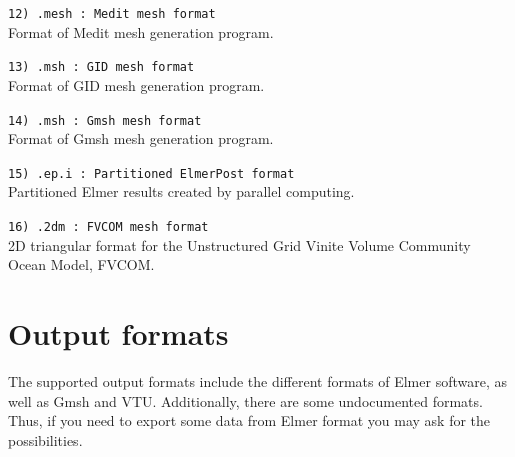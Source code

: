 \begin{description}
\item \texttt{12) .mesh     : Medit mesh format} \\
Format of Medit mesh generation program.

\item \texttt{13) .msh      : GID mesh format} \\
Format of GID mesh generation program.

\item \texttt{14) .msh      : Gmsh mesh format} \\
Format of Gmsh mesh generation program.

\item \texttt{15) .ep.i     : Partitioned ElmerPost format} \\
Partitioned Elmer results created by parallel computing. 

\item \texttt{16) .2dm      : FVCOM mesh format} \\
2D triangular format for the Unstructured Grid Vinite Volume Community Ocean Model, FVCOM.
  
\end{description}

\section{Output formats}
The supported output formats include the different
formats of Elmer software, as well as Gmsh and VTU.
Additionally, there are some undocumented formats.
Thus, if you need to export some data from Elmer format you may
ask for the possibilities. 


